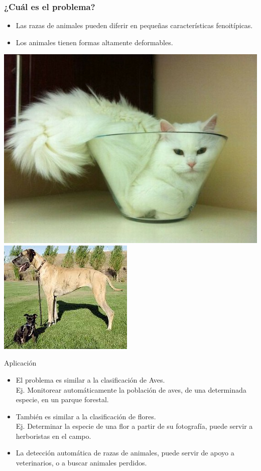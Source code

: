 \documentclass{beamer}
\begin{document}
	\begin{frame}
		\frametitle{¿Cuál es el problema?}
		\begin{itemize}
			\item Las razas de animales pueden diferir en pequeñas características fenoitípicas.
			\item Los animales tienen formas altamente deformables.
		\end{itemize}
        \begin{center}
    		{\includegraphics[scale=0.2]{imagen/fitsisits.jpg}}
	    	{\includegraphics[scale=0.5]{imagen/dogdiff.jpg}}
        \end{center}
	\end{frame}
	\begin{frame}{Aplicación}
		\begin{itemize}
			\item{El problema es similar a la clasificación de Aves.\\
			Ej. Monitorear automáticamente la población de aves, de una determinada especie, en un parque forestal.\\
			}
			\item{También es similar a la clasificación de  flores.\\
			Ej. Determinar la especie de una flor a partir de su fotografía, puede servir a herboristas en el campo.
			}
			\item{La detección automática de razas de animales, puede servir de apoyo a veterinarios, o a buscar animales perdidos.\\
			}
		\end{itemize}
	\end{frame}
\end{document}
